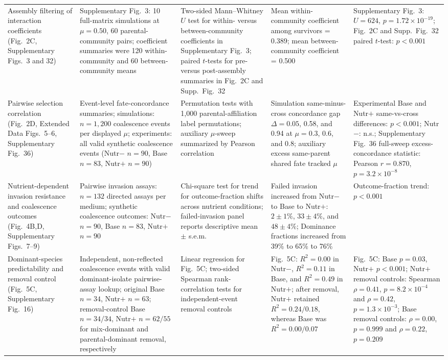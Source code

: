 \begin{longtable}{L{0.16\textwidth}L{0.18\textwidth}L{0.18\textwidth}L{0.22\textwidth}L{0.18\textwidth}}
Assembly filtering of interaction coefficients (Fig.~2C, Supplementary Figs.~3 and 32) &
Supplementary Fig.~3: 10 full-matrix simulations at $\mu = 0.50$, 60 parental-community pairs; coefficient summaries were 120 within-community and 60 between-community means &
Two-sided Mann--Whitney $U$ test for within- versus between-community coefficients in Supplementary Fig.~3; paired $t$-tests for pre- versus post-assembly summaries in Fig.~2C and Supp.~Fig.~32 &
Mean within-community coefficient among survivors = 0.389; mean between-community coefficient = 0.500 &
Supplementary Fig.~3: $U = 624$, $p = 1.72 \times 10^{-19}$; Fig.~2C and Supp.~Fig.~32 paired $t$-test: $p < 0.001$ \\

Pairwise selection correlation (Fig.~2D, Extended Data Figs.~5--6, Supplementary Fig.~36) &
Event-level fate-concordance summaries; simulations: $n = 1{,}200$ coalescence events per displayed $\mu$; experiments: all valid synthetic coalescence events (Nutr$-$ $n=90$, Base $n=83$, Nutr$+$ $n=90$) &
Permutation tests with 1,000 parental-affiliation label permutations; auxiliary $\mu$-sweep summarized by Pearson correlation &
Simulation same-minus-cross concordance gap $\Delta = 0.05$, 0.58, and 0.94 at $\mu = 0.3$, 0.6, and 0.8; auxiliary excess same-parent shared fate tracked $\mu$ &
Experimental Base and Nutr$+$ same-vs-cross differences: $p < 0.001$; Nutr$-$: n.s.; Supplementary Fig.~36 full-sweep excess-concordance statistic: Pearson $r = 0.870$, $p = 3.2 \times 10^{-8}$ \\

Nutrient-dependent invasion resistance and coalescence outcomes (Fig.~4B,D, Supplementary Figs.~7--9) &
Pairwise invasion assays: $n = 132$ directed assays per medium; synthetic coalescence outcomes: Nutr$-$ $n=90$, Base $n=83$, Nutr$+$ $n=90$ &
Chi-square test for trend for outcome-fraction shifts across nutrient conditions; failed-invasion panel reports descriptive mean $\pm$ s.e.m. &
Failed invasion increased from Nutr$-$ to Base to Nutr$+$: $2 \pm 1\%$, $33 \pm 4\%$, and $48 \pm 4\%$; Dominance fractions increased from 39\% to 65\% to 76\% &
Outcome-fraction trend: $p < 0.001$ \\

Dominant-species predictability and removal control (Fig.~5C, Supplementary Fig.~16) &
Independent, non-reflected coalescence events with valid dominant-isolate pairwise-assay lookup; original Base $n=34$, Nutr$+$ $n=63$; removal-control Base $n=34/34$, Nutr$+$ $n=62/55$ for mix-dominant and parental-dominant removal, respectively &
Linear regression for Fig.~5C; two-sided Spearman rank-correlation tests for independent-event removal controls &
Fig.~5C: $R^2 = 0.00$ in Nutr$-$, $R^2 = 0.11$ in Base, and $R^2 = 0.49$ in Nutr$+$; after removal, Nutr$+$ retained $R^2 = 0.24/0.18$, whereas Base was $R^2 = 0.00/0.07$ &
Fig.~5C: Base $p = 0.03$, Nutr$+$ $p < 0.001$; Nutr$+$ removal controls: Spearman $\rho = 0.41$, $p = 8.2 \times 10^{-4}$ and $\rho = 0.42$, $p = 1.3 \times 10^{-3}$; Base removal controls: $\rho = 0.00$, $p = 0.999$ and $\rho = 0.22$, $p = 0.209$ \\


\end{longtable}
